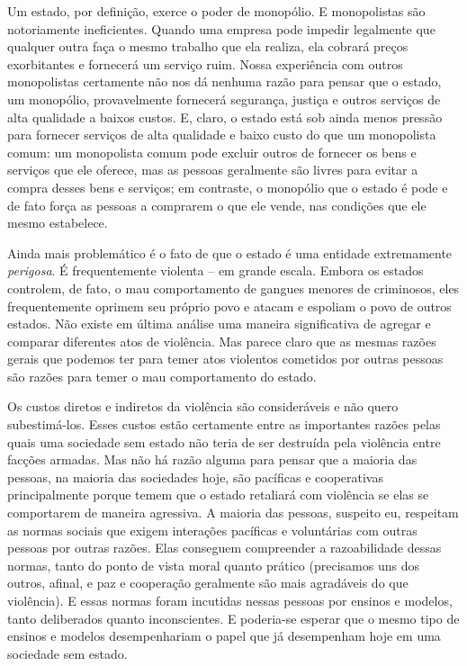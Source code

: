Um estado, por definição, exerce o poder de monopólio. E monopolistas são notoriamente ineficientes. Quando uma empresa pode impedir legalmente que qualquer outra faça o mesmo trabalho que ela realiza, ela cobrará preços exorbitantes e fornecerá um serviço ruim. Nossa experiência com outros monopolistas certamente não nos dá nenhuma razão para pensar que o estado, um monopólio, provavelmente fornecerá segurança, justiça e outros serviços de alta qualidade a baixos custos. E, claro, o estado está sob ainda menos pressão para fornecer serviços de alta qualidade e baixo custo do que um monopolista comum: um monopolista comum pode excluir outros de fornecer os bens e serviços que ele oferece, mas as pessoas geralmente são livres para evitar a compra desses bens e serviços; em contraste, o monopólio que o estado é pode e de fato força as pessoas a comprarem o que ele vende, nas condições que ele mesmo estabelece.

Ainda mais problemático é o fato de que o estado é uma entidade extremamente \emph{perigosa}. É frequentemente violenta -- em grande escala. Embora os estados controlem, de fato, o mau comportamento de gangues menores de criminosos, eles frequentemente oprimem seu próprio povo e atacam e espoliam o povo de outros estados. Não existe em última análise uma maneira significativa de agregar e comparar diferentes atos de violência. Mas parece claro que as mesmas razões gerais que podemos ter para temer atos violentos cometidos por outras pessoas são razões para temer o mau comportamento do estado.

Os custos diretos e indiretos da violência são consideráveis e não quero subestimá-los. Esses custos estão certamente entre as importantes razões pelas quais uma sociedade sem estado não teria de ser destruída pela violência entre facções armadas. Mas não há razão alguma para pensar que a maioria das pessoas, na maioria das sociedades hoje, são pacíficas e cooperativas principalmente porque temem que o estado retaliará com violência se elas se comportarem de maneira agressiva. A maioria das pessoas, suspeito eu, respeitam as normas sociais que exigem interações pacíficas e voluntárias com outras pessoas por outras razões. Elas conseguem compreender a razoabilidade dessas normas, tanto do ponto de vista moral quanto prático (precisamos uns dos outros, afinal, e paz e cooperação geralmente são mais agradáveis do que violência). E essas normas foram incutidas nessas pessoas por ensinos e modelos, tanto deliberados quanto inconscientes. E poderia-se esperar que o mesmo tipo de ensinos e modelos desempenhariam o papel que já desempenham hoje em uma sociedade sem estado.

